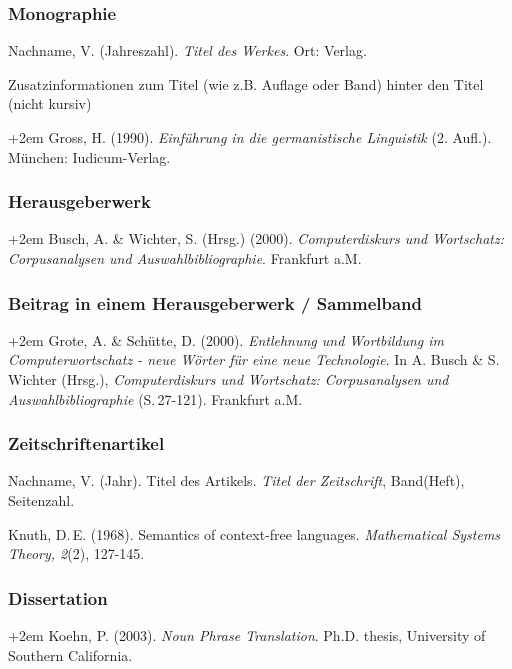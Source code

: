 \documentclass[a4paper,oneside,DIV8,10pt]{scrartcl}
\newcommand{\zit}[1]{%
\fontfamily{phv}\selectfont #1\normalfont}
\begin{document}
    \subsubsection{Monographie}
        \begin{compactitem}
            \item Nachname, V. (Jahreszahl). \textit{Titel des Werkes}. Ort: Verlag. 
            \item Zusatzinformationen zum Titel (wie z.B. Auflage oder Band)
            hinter den Titel (nicht kursiv)
        \end{compactitem}
        \hangindent+2em 
        \zit{Gross, H. (1990). \textit{Einführung in die germanistische Linguistik} (2. Aufl.). München: Iudicum-Verlag.}
    
    \subsubsection{Herausgeberwerk}
        \hangindent+2em 
        \zit{Busch, A. \& Wichter, S. (Hrsg.) (2000). \textit{Computerdiskurs und Wortschatz: 
        Corpusanalysen und Auswahlbibliographie}. Frankfurt a.M.}

    \subsubsection{Beitrag in einem Herausgeberwerk / Sammelband}
        \hangindent+2em 
        \zit{Grote, A. \& Schütte, D. (2000). \textit{Entlehnung und 
        Wortbildung im Computerwortschatz - neue Wörter für eine neue Technologie}. 
        In A. Busch \& S. Wichter (Hrsg.), \textit{Computerdiskurs und Wortschatz: 
        Corpusanalysen und Auswahlbibliographie} (S.\,27-121). Frankfurt a.M.}

    \subsubsection{Zeitschriftenartikel}
        \begin{compactitem}
            \item Nachname, V. (Jahr). Titel des Artikels. \textit{Titel der Zeitschrift}, Band(Heft), Seitenzahl.
        \end{compactitem}
        \zit{Knuth, D.\,E. (1968). Semantics of context-free
        languages. \textit{Mathematical Systems Theory, 2}(2), 127-145.}
        
    \subsubsection{Dissertation}
        \hangindent+2em 
        \zit{Koehn, P. (2003). \textit{Noun Phrase Translation}. Ph.D. thesis, 
        University of Southern California.}
        
\end{document}
